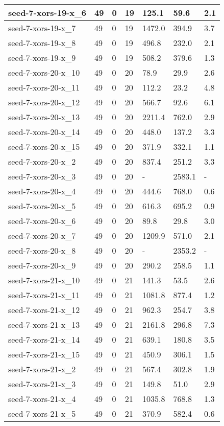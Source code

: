 \begin{scriptsize}
\begin{longtable}{|p{5cm}|l|l|l|l|l|l|}
seed-7-xors-19-x\_6&49&0&19&125.1&59.6&2.1 \\ \hline 
seed-7-xors-19-x\_7&49&0&19&1472.0&394.9&3.7 \\ \hline 
seed-7-xors-19-x\_8&49&0&19&496.8&232.0&2.1 \\ \hline 
seed-7-xors-19-x\_9&49&0&19&508.2&379.6&1.3 \\ \hline 
seed-7-xors-20-x\_10&49&0&20&78.9&29.9&2.6 \\ \hline 
seed-7-xors-20-x\_11&49&0&20&112.2&23.2&4.8 \\ \hline 
seed-7-xors-20-x\_12&49&0&20&566.7&92.6&6.1 \\ \hline 
seed-7-xors-20-x\_13&49&0&20&2211.4&762.0&2.9 \\ \hline 
seed-7-xors-20-x\_14&49&0&20&448.0&137.2&3.3 \\ \hline 
seed-7-xors-20-x\_15&49&0&20&371.9&332.1&1.1 \\ \hline 
seed-7-xors-20-x\_2&49&0&20&837.4&251.2&3.3 \\ \hline 
seed-7-xors-20-x\_3&49&0&20&-&2583.1&- \\ \hline 
seed-7-xors-20-x\_4&49&0&20&444.6&768.0&0.6 \\ \hline 
seed-7-xors-20-x\_5&49&0&20&616.3&695.2&0.9 \\ \hline 
seed-7-xors-20-x\_6&49&0&20&89.8&29.8&3.0 \\ \hline 
seed-7-xors-20-x\_7&49&0&20&1209.9&571.0&2.1 \\ \hline 
seed-7-xors-20-x\_8&49&0&20&-&2353.2&- \\ \hline 
seed-7-xors-20-x\_9&49&0&20&290.2&258.5&1.1 \\ \hline 
seed-7-xors-21-x\_10&49&0&21&141.3&53.5&2.6 \\ \hline 
seed-7-xors-21-x\_11&49&0&21&1081.8&877.4&1.2 \\ \hline 
seed-7-xors-21-x\_12&49&0&21&962.3&254.7&3.8 \\ \hline 
seed-7-xors-21-x\_13&49&0&21&2161.8&296.8&7.3 \\ \hline 
seed-7-xors-21-x\_14&49&0&21&639.1&180.8&3.5 \\ \hline 
seed-7-xors-21-x\_15&49&0&21&450.9&306.1&1.5 \\ \hline 
seed-7-xors-21-x\_2&49&0&21&567.4&302.8&1.9 \\ \hline 
seed-7-xors-21-x\_3&49&0&21&149.8&51.0&2.9 \\ \hline 
seed-7-xors-21-x\_4&49&0&21&1035.8&768.8&1.3 \\ \hline 
seed-7-xors-21-x\_5&49&0&21&370.9&582.4&0.6 \\ \hline 

\end{longtable}
\end{scriptsize}
